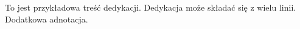 \dedication{6cm}{%
    To jest przykładowa treść dedykacji. Dedykacja może składać się z wielu linii.
    \\[1em]
    
    Dodatkowa adnotacja.
}